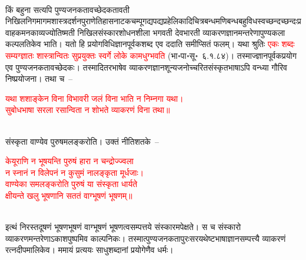 \\
\begin{sloppypar}\justifying\noindent किं बहुना सत्यपि पुण्य\-जनकतावच्छेदकतावती निखिल\-निगमागम\-शास्त्र\-दर्शन\-पुराणेतिहास\-नाटक\-चम्पू\-गद्य\-पद्य\-प्रहेलिकादि\-चित्र\-बन्ध\-मणि\-बन्ध\-बहु\-विध\-स्वच्छन्द\-च्छन्दः\-प्रवाह\-कमन\-काव्य\-ज्योतिष्मती निखिल\-संस्कार\-शोधन\-शीला भगवती देव\-भारती व्याकरण\-ज्ञानमन्तरेणापुण्य\-कला कल्प\-लतिकेव भाति। यतो हि प्रयोग\-विधि\-ज्ञान\-पूर्वक\-शब्द एव ददाति समीप्सितं फलम्। यथा श्रुतिः \textcolor{red}{एकः शब्दः सम्यग्ज्ञातः शास्त्रान्वितः सुप्रयुक्तः स्वर्गे लोके कामधुग्भवति} (भा॰पा॰सू॰~६.१.८४)। तस्माज्ज्ञान\-पूर्वक\-प्रयोग एव पुण्य\-जनकतावच्छेदकः। तस्मादितर\-भाषेव व्याकरण\-ज्ञान\-शून्य\-जनोच्चरित\-संस्कृत\-भाषाऽपि वन्ध्या गौरिव निष्प्रयोजना। तथा च~–\end{sloppypar}
\centering\textcolor{red}{यथा शशाङ्केन विना विभावरी जलं विना भाति न निम्नगा यथा।\nopagebreak\\
सुबोधभाषा सरला रसान्विता न शोभते व्याकरणं विना तथा॥}\nopagebreak\\
\\
\begin{sloppypar}\justifying\noindent संस्कृता वाण्येव पुरुषमलङ्करोति। उक्तं नीतिशतके~–\end{sloppypar}
\centering\textcolor{red}{केयूराणि न भूषयन्ति पुरुषं हारा न चन्द्रोज्ज्वला\nopagebreak\\
न स्नानं न विलेपनं न कुसुमं नालङ्कृता मूर्धजाः।\nopagebreak\\
वाण्येका समलङ्करोति पुरुषं या संस्कृता धार्यते\nopagebreak\\
क्षीयन्ते खलु भूषणानि सततं वाग्भूषणं भूषणम्॥}\nopagebreak\\
\\
\begin{sloppypar}\justifying\noindent इत्थं निरस्त\-दूषणं भूषण\-भूषणं वाग्भूषणं भूषणत्वसम्पत्तये संस्कारमपेक्षते। स च संस्कारो व्याकरणमन्तरेणाऽकाश\-पुष्पमिव काल्पनिकः। तस्मात्पुण्य\-जनकता\-पुरःसर\-यथेष्ट\-भाषा\-ज्ञान\-सम्पत्त्यै व्याकरणं रत्नदीप\-मालिकेव। ममायं प्रत्ययः साधु\-शब्दानां प्रयोगेणैव धर्मः। \end{sloppypar}
